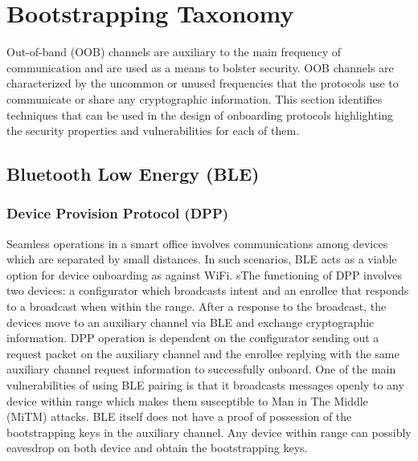 \section{Bootstrapping Taxonomy}

Out-of-band (OOB) channels are auxiliary to the main frequency of communication and are used as a means to bolster security.
OOB channels are characterized by the uncommon or unused frequencies that the protocols use to communicate or share any cryptographic information.
This section identifies techniques that can be used in the design of onboarding protocols highlighting the security properties and vulnerabilities for each of them. 

\subsection{Bluetooth Low Energy (BLE)}
\subsubsection{Device Provision Protocol (DPP)}
Seamless operations in a smart office involves communications among devices which are separated by small distances.
In such scenarios, BLE acts as a viable option for device onboarding as against WiFi.
sThe functioning of DPP involves two devices: a configurator which broadcasts intent and an enrollee that responds to a broadcast when within the range.
After a response to the broadcast, the devices move to an auxiliary channel via BLE and exchange cryptographic information.
DPP operation is dependent on the configurator sending out a request packet on the auxiliary channel and the enrollee replying with the same auxiliary channel request information to successfully onboard.
One of the main vulnerabilities of using BLE pairing is that it broadcasts messages openly to any device within range which makes them susceptible to Man in The Middle (MiTM) attacks.
BLE itself does not have a proof of possession of the bootstrapping keys in the auxiliary channel.
Any device within range can possibly eavesdrop on both device and obtain the bootstrapping keys.


